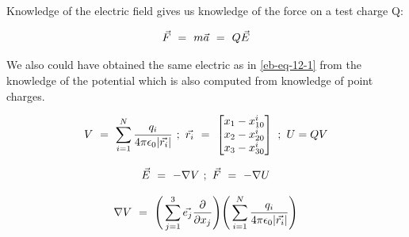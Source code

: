 \documentclass{article}
\begin{document}
Knowledge of the electric field gives us knowledge of the force on a test charge Q:

\begin{equation} \label{eb-eq-13-1}
\vec{F} \hspace{0.125cm} = \hspace{0.125cm} m\vec{a} \hspace{0.125cm} = \hspace{0.125cm} Q\vec{E}
\end{equation}

We also could have obtained the same electric as in \ref{eb-eq-12-1} from the knowledge of the potential which is also computed from knowledge of point charges. 

\begin{equation} \label{eb-eq-14-1}
V \hspace{0.125cm} = \hspace{0.125cm} \sum_{i=1}^{N} \frac{q_i}{4\pi \epsilon_0 |\vec{r_i}|} \hspace{0.125cm} ; \hspace{0.125cm} \vec{r_i}  \hspace{0.125cm} =  \hspace{0.125cm} \begin{bmatrix} x_1 -  x_{10}^{i} \\ x_2 - x_{20}^{i} \\ x_3 - x_{30}^{i} \end{bmatrix} \hspace{0.125cm} ; \hspace{0.125cm} U = QV
\end{equation}

\begin{equation} \label{eb-eq-15-1}
\vec{E} \hspace{0.125cm} = \hspace{0.125cm} -\nabla{V} \hspace{0.125cm} ; \hspace{0.125cm} \vec{F} \hspace{0.125cm} = \hspace{0.125cm} -\nabla{U} 
\end{equation}

\begin{equation} \label{eb-eq-16-1}
\nabla{V} \hspace{0.125cm} = \hspace{0.125cm} \Bigg( \sum_{j=1}^{3} \vec{e_j} \frac{\partial{}}{\partial{x_j}} \Bigg) \Bigg(\sum_{i=1}^{N} \frac{q_i}{4\pi \epsilon_0 |\vec{r_i}|} \Bigg) 
\end{equation}
\end{document}
